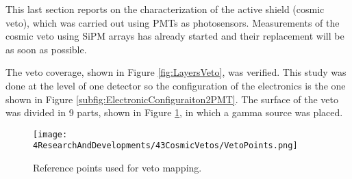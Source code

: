 This last section reports on the characterization of the active shield (cosmic veto), which was carried out using PMTs as photosensors. Measurements of the cosmic veto using SiPM arrays has already started and their replacement will be as soon as possible. 

The veto coverage, shown in Figure \ref{fig:LayersVeto}, was verified. This study was done at the level of one detector so the configuration of the electronics is the one shown in Figure \ref{subfig:ElectronicConfiguraiton2PMT}. The surface of the veto was divided in 9 parts, shown in Figure \ref{fig:MappingPoints}, in which a gamma source was placed.

\begin{figure}[h]
\centering
\texttt{[image: 4ResearchAndDevelopments/43CosmicVetos/VetoPoints.png]}
\caption{Reference points used for veto mapping.\label{fig:MappingPoints}}
\end{figure}

